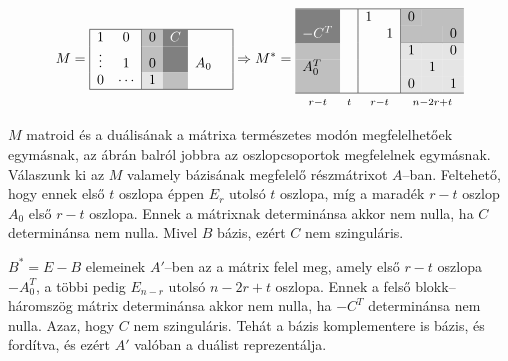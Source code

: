 \[ 
M=
\begin{array}{|cc|c|c|rc|}
\hline
1       &  0     & \multicolumn{1}{>{\columncolor{lightgray}}l}{\color{black}0} & \multicolumn{1}{>{\columncolor{gray}}l}{\color{white}C} &     &\\
\vdots &  1     & \multicolumn{1}{>{\columncolor{lightgray}}l}{\color{black}0} &  \multicolumn{1}{>{\columncolor{gray}}l}{\color{white}} & A_0 &\\
0       &  \cdots  & \multicolumn{1}{>{\columncolor{ColorGreyish}}l}{\color{black}1} &\multicolumn{1}{>{\columncolor{lightgray}}l}{\color{black}}   &     &\\
\hline
\end{array}
\Rightarrow
M^*=
\begin{array}{|c|c|cc|lcr|}
\hline
\multicolumn{1}{>{\columncolor{gray}}l}{\color{white}}        & & 1&  &\multicolumn{1}{>{\columncolor{lightgray}}l}{\color{black}0} & \multicolumn{2}{>{\columncolor{lightgray}}l}{\color{black}}  \\
\multicolumn{1}{>{\columncolor{gray}}l}{\color{white}-C^T}    & &  & 1&\multicolumn{2}{>{\columncolor{lightgray}}l}{\color{black}} &\multicolumn{1}{>{\columncolor{lightgray}}l}{\color{black}0}  \\
\cline{1-1} \cline{5-7}
\multicolumn{1}{>{\columncolor{lightgray}}l}{\color{black}}   & &  &  & \multicolumn{1}{>{\columncolor{ColorGreyish}}l}{\color{black}1} & \multicolumn{1}{>{\columncolor{ColorGreyish}}l}{\color{black}} &\multicolumn{1}{>{\columncolor{ColorGreyish}}l}{\color{black}0}  \\
\multicolumn{1}{>{\columncolor{lightgray}}l}{\color{black}A_0^T}     & &  && \multicolumn{1}{>{\columncolor{ColorGreyish}}l}{\color{black}}  & \multicolumn{1}{>{\columncolor{ColorGreyish}}l}{\color{black}1}   & \multicolumn{1}{>{\columncolor{ColorGreyish}}l}{\color{black}} \\
\multicolumn{1}{>{\columncolor{lightgray}}l}{\color{black}} & &  &  & \multicolumn{1}{>{\columncolor{ColorGreyish}}l}{\color{black}0}  & \multicolumn{1}{>{\columncolor{ColorGreyish}}l}{\color{black}}  & \multicolumn{1}{>{\columncolor{ColorGreyish}}l}{\color{black}1} \\ \hline
\multicolumn{1}{c}{\mathsmaller{r-t}} & \multicolumn{1}{c}{\mathsmaller{t}} & \multicolumn{2}{c}{\mathsmaller{r-t}} & \multicolumn{3}{c}{\mathsmaller{n-2r+t}}
\end{array} 
\]

$M$ matroid és a duálisának a mátrixa természetes modón megfelelhetőek
egymásnak, az ábrán balról jobbra az oszlopcsoportok megfelelnek egymásnak.
Válaszunk ki az $M$ valamely bázisának megfelelő részmátrixot $A$--ban.
Feltehető, hogy ennek első $t$ oszlopa éppen $E_r$ utolsó $t$ oszlopa, míg a
maradék $r-t$ oszlop $A_0$ első $r-t$ oszlopa. Ennek a mátrixnak determinánsa
akkor nem nulla, ha $C$ determinánsa nem nulla. Mivel $B$ bázis, ezért $C$ nem
szinguláris.

$B^*=E-B$ elemeinek $A'$--ben az a mátrix felel meg, amely első $r-t$ oszlopa
$-A_0^T$, a többi pedig $E_{n-r}$ utolsó $n-2r+t$ oszlopa. Ennek a felső
blokk--háromszög mátrix determinánsa akkor nem nulla, ha $-C^T$ determinánsa nem
nulla.  Azaz, hogy $C$ nem szinguláris. Tehát a bázis komplementere is bázis, és
fordítva, és ezért $A'$ valóban a duálist reprezentálja.
